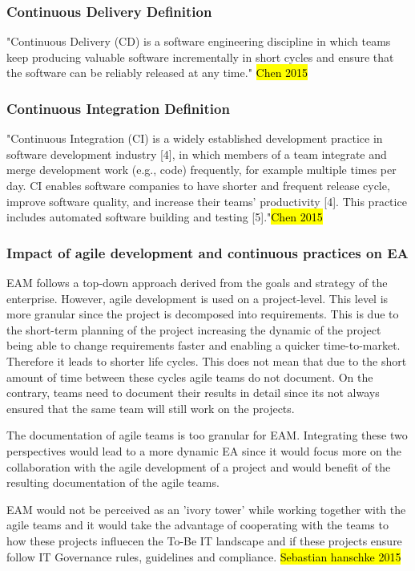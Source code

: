 \subsubsection{Continuous Delivery Definition}
"Continuous Delivery (CD) is a software engineering discipline in which teams keep producing valuable software incrementally in short cycles and ensure that the software can be reliably released at any time." \hl{Chen 2015}

\subsubsection{Continuous Integration Definition}
"Continuous Integration (CI) is a widely established
development practice in software development industry [4],
in which members of a team integrate and merge development
work (e.g., code) frequently, for example multiple
times per day. CI enables software companies to have shorter
and frequent release cycle, improve software quality, and
increase their teams' productivity [4]. This practice includes
automated software building and testing [5]."\hl{Chen 2015}

\subsubsection{Impact of agile development and continuous practices on EA}
EAM follows a top-down approach derived from the goals and strategy of the enterprise. However, agile development is used on a project-level. This level is more granular since the project is decomposed into requirements. This is due to the short-term planning of the project increasing the dynamic of the project being able to change requirements faster and enabling a quicker time-to-market. Therefore it leads to shorter life cycles. This does not mean that due to the short amount of time between these cycles agile teams do not document. On the contrary, teams need to document their results in detail since its not always ensured that the same team will still work on the projects.

The documentation of agile teams is too granular for EAM. Integrating these two perspectives would lead to a more dynamic EA since it would focus more on the collaboration with the agile development of a project and would benefit of the resulting documentation of the agile teams. 

EAM would not be perceived as an 'ivory tower' while working together with the agile teams and it would take the advantage of cooperating with the teams to how these projects influecen the To-Be IT landscape and if these projects ensure follow IT Governance rules, guidelines and compliance. \hl{Sebastian hanschke 2015}

